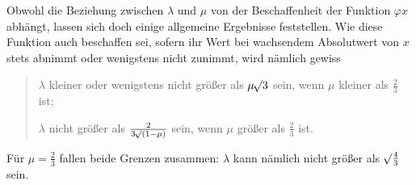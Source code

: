 Obwohl die Beziehung zwischen \(\lambda\) und \(\mu\) von der Beschaffenheit der Funktion \(\varphi x\) abhängt, lassen sich doch einige allgemeine Ergebnisse feststellen. Wie diese Funktion auch beschaffen sei, sofern ihr Wert bei wachsendem Absolutwert von \(x\) stets abnimmt oder wenigstens nicht zunimmt, wird nämlich gewiss
\begin{quote}
\(\lambda\) kleiner oder wenigstens nicht größer als \(\mu\mathord{{}^{}\!\surd}3\) sein, wenn \(\mu\) kleiner als \(\tfrac23\) ist;

\(\lambda\) nicht größer als \(\frac{2}{3\mathord{{}^{}\!\surd}(1-\mu)}\) sein, wenn \(\mu\) größer als \(\tfrac23\) ist.
\end{quote}
Für \(\mu=\tfrac23\) fallen beide Grenzen zusammen: \(\lambda\) kann nämlich nicht größer als \(\mathord{{}^{}\!\surd}\tfrac43\) sein.

